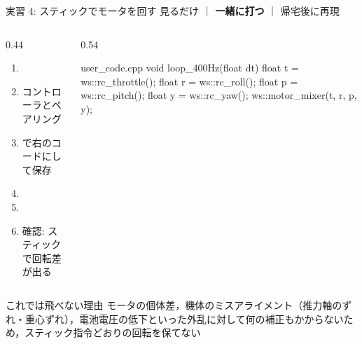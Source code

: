 \begin{frame}[fragile]{実習 4: スティックでモータを回す}
  \vspace{0.15em}
  {\small 見るだけ ｜ \textcolor{sfblue}{\textbf{一緒に打つ}} ｜ 帰宅後に再現}

  \begin{columns}[T]
    \begin{column}{0.44\textwidth}
      \footnotesize
      \begin{enumerate}\setlength{\itemsep}{0pt}
        \item {}
        \item コントローラとペアリング
        \item {} で右のコードにして保存
        \item {}
        \item {}
        \item 確認: スティックで回転差が出る
      \end{enumerate}
    \end{column}
    \begin{column}{0.54\textwidth}
      \begin{sflisting}[basicstyle=\ttfamily\scriptsize]{user\_code.cpp}
void loop_400Hz(float dt) {
    float t = ws::rc_throttle();
    float r = ws::rc_roll();
    float p = ws::rc_pitch();
    float y = ws::rc_yaw();
    ws::motor_mixer(t, r, p, y);
}
      \end{sflisting}
    \end{column}
  \end{columns}

  \begin{alertblock}{これでは飛べない理由}
    \scriptsize モータの個体差，機体のミスアライメント（推力軸のずれ・重心ずれ），電池電圧の低下といった外乱に対して何の補正もかからないため，スティック指令どおりの回転を保てない
  \end{alertblock}
\end{frame}

